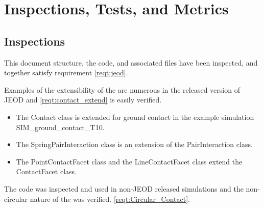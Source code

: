 %
%
%  
%


\chapter{Inspections, Tests, and Metrics}\label{ch:ivv}

\section{Inspections}

\label{inspect:jeod}
 This document structure, the code, and associated files have been inspected, and together satisfy requirement \ref{reqt:jeod}.


\label{inspect:contact_extend}
 Examples of the extensibility of the \ModelDesc are numerous in the released version of JEOD and \ref{reqt:contact_extend} is easily verified.
\begin{itemize}
\item The Contact class is extended for ground contact in the example simulation SIM\_ground\_contact\_T10.
\item The SpringPairInteraction class is an extension of the PairInteraction class.
\item The PointContactFacet class and the LineContactFacet class extend the ContactFacet class.
\end{itemize}

\label{inspect:Circular_Contact}
 The code was inspected and used in non-JEOD released simulations and the non-circular nature of the \ModelDesc was verified. \ref{reqt:Circular_Contact}.


